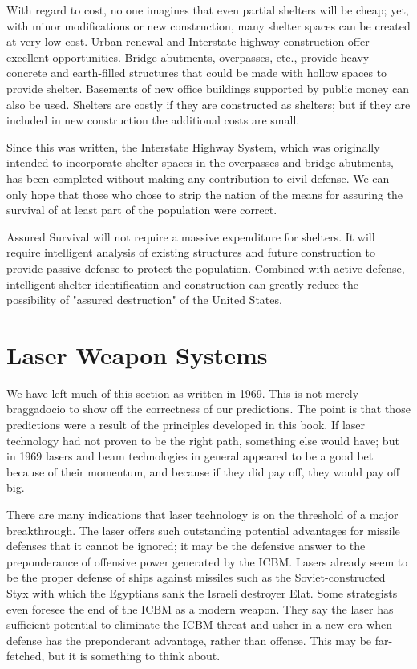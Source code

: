 With regard to cost, no one imagines that even partial shelters will be cheap; yet, with minor modifications or new construction, many shelter spaces can be created at very low cost. Urban renewal and Interstate highway construction offer excellent opportunities. Bridge abutments, overpasses, etc., provide heavy concrete and earth-filled structures that could be made with hollow spaces to provide shelter. Basements of new office buildings supported by public money can also be used. Shelters are costly if they are constructed as shelters; but if they are included in new construction the additional costs are small.

\begin{mdframed}[backgroundcolor=black!10]
Since this was written, the Interstate Highway System, which was originally intended to incorporate shelter spaces in the overpasses and bridge abutments, has been completed without making any contribution to civil defense. We can only hope that those who chose to strip the nation of the means for assuring the survival of at least part of the population were correct.
\end{mdframed}

Assured Survival will not require a massive expenditure for shelters. It will require intelligent analysis of existing structures and future construction to provide passive defense to protect the population. Combined with active defense, intelligent shelter identification and construction can greatly reduce the possibility of "assured destruction" of the United States.

\section{Laser Weapon Systems}

\begin{mdframed}[backgroundcolor=black!10]
We have left much of this section as written in 1969. This is not merely braggadocio to show off the correctness of our predictions. The point is that those predictions were a result of the principles developed in this book. If laser technology had not proven to be the right path, something else would have; but in 1969 lasers and beam technologies in general appeared to be a good bet because of their momentum, and because if they did pay off, they would pay off big.
\end{mdframed}

There are many indications that laser technology is on the threshold of a major breakthrough. The laser offers such outstanding potential advantages for missile defenses that it cannot be ignored; it may be the defensive answer to the preponderance of offensive power generated by the ICBM. Lasers already seem to be the proper defense of ships against missiles such as the Soviet-constructed Styx with which the Egyptians sank the Israeli destroyer Elat. Some strategists even foresee the end of the ICBM as a modern weapon. They say the laser has sufficient potential to eliminate the ICBM threat and usher in a new era when defense has the preponderant advantage, rather than offense. This may be far-fetched, but it is something to think about.

